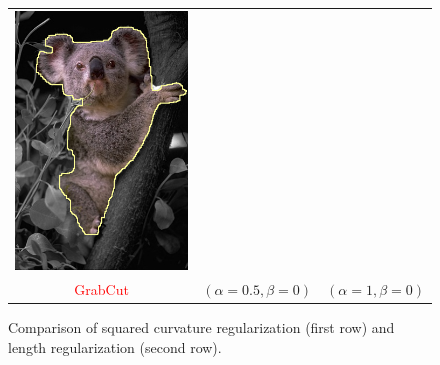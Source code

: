 \documentclass[smallextended]{svjour3}       %
\newcommand{\revision}[1]{\textcolor{red}{#1}}
\begin{document}
{{\begin{figure}[ht!]
\begin{tabular}{ccc}
	\includegraphics[scale=0.25]{images/segmentation/bc/coala/r3/lg2_sq0_dt1_it50.png} \\

	\revision{GrabCut} & $(\alpha=0.5, \beta=0)$ & $(\alpha=1, \beta=0)$
\end{tabular}	
\caption{Comparison of squared curvature regularization (first row) and length regularization (second row). }
\label{fig:parameters-influence}
\end{figure}

}}
\end{document}
